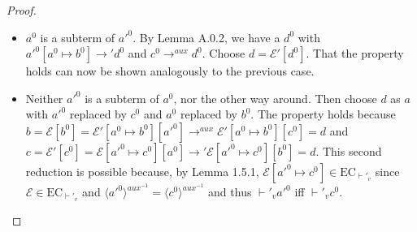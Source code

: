 \begin{proof}
\begin{enumerate}
\begin{itemize}
\item $a^0$ is a subterm of $a'^0$. By Lemma A.0.2, we have a $d^0$ with $a'^0[a^0 \mapsto b^0] \longrightarrow' d^0$ and $c^0 \longrightarrow^{aux} d^0$. Choose $d = \mathcal{E}'[d^0]$. That the property holds can now be shown analogously to the previous case.

\item Neither $a'^0$ is a subterm of $a^0$, nor the other way around. Then choose $d$ as $a$ with $a'^0$ replaced by $c^0$ and $a^0$ replaced by $b^0$. The property holds because $b = \mathcal{E}[b^0] = \mathcal{E}'[a^0 \mapsto b^0][a'^0] \longrightarrow^{aux} \mathcal{E}'[a^0 \mapsto b^0][c^0] = d$ and $c = \mathcal{E}'[c^0] = \mathcal{E}[a'^0 \mapsto c^0][a^0] \longrightarrow' \mathcal{E}[a'^0 \mapsto c^0][b^0] = d$. This second reduction is possible because, by Lemma 1.5.1, $\mathcal{E}[a'^0 \mapsto c^0] \in \textrm{EC}_{\vdash'_v}$ since $\mathcal{E} \in \textrm{EC}_{\vdash'_v}$ and $\langle a'^0 \rangle^{aux^{-1}} = \langle c^0 \rangle^{aux^{-1}}$ and thus $\vdash'_v a'^0$ iff $\vdash'_v c^0$.
\end{itemize}

\end{enumerate}

\end{proof}


